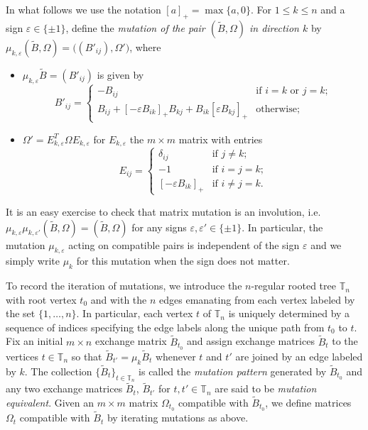 \documentclass{amsart}
\newcommand{\TT}{\mathbb{T}}
\renewcommand{\max}{\operatorname{max}}
\begin{document}
In what follows we use the notation $[a]_+=\max\{a,0\}$.
For $1\le k\le n$ and a sign $\varepsilon\in\{\pm1\}$, define the \emph{mutation of the pair $(\tilde B,\Omega)$ in direction $k$} by $\mu_{k,\varepsilon}(\tilde B,\Omega)=\big((B'_{ij}),\Omega'\big)$, where
\begin{itemize}
  \item $\mu_{k,\varepsilon}\tilde B=(B'_{ij})$ is given by
    \[B'_{ij}=\begin{cases}-B_{ij} & \text{if $i=k$ or $j=k$;}\\ B_{ij}+[-\varepsilon B_{ik}]_+B_{kj}+B_{ik}[\varepsilon B_{kj}]_+ & \text{otherwise;}\end{cases}\]
  \item $\Omega'=E_{k,\varepsilon}^T\Omega E_{k,\varepsilon}$ for $E_{k,\varepsilon}$ the $m\times m$ matrix with entries
    \[E_{ij}=\begin{cases}\delta_{ij} & \text{if $j\ne k$;}\\ -1 & \text{if $i=j=k$;}\\ [-\varepsilon B_{ik}]_+ & \text{if $i\ne j=k$.}\end{cases}\]
\end{itemize}
It is an easy exercise to check that matrix mutation is an involution, i.e.\ $\mu_{k,\varepsilon}\mu_{k,\varepsilon'}(\tilde B,\Omega)=(\tilde B,\Omega)$ for any signs $\varepsilon,\varepsilon'\in\{\pm1\}$.
In particular, the mutation $\mu_{k,\varepsilon}$ acting on compatible pairs is independent of the sign $\varepsilon$ and we simply write $\mu_k$ for this mutation when the sign does not matter.

To record the iteration of mutations, we introduce the $n$-regular rooted tree $\TT_n$ with root vertex $t_0$ and with the $n$ edges emanating from each vertex labeled by the set $\{1,\ldots,n\}$.
In particular, each vertex $t$ of $\TT_n$ is uniquely determined by a sequence of indices specifying the edge labels along the unique path from $t_0$ to $t$.
Fix an initial $m\times n$ exchange matrix $\tilde B_{t_0}$ and assign exchange matrices $\tilde B_t$ to the vertices $t\in\TT_n$ so that $\tilde B_{t'}=\mu_k\tilde B_t$ whenever $t$ and $t'$ are joined by an edge labeled by $k$.
The collection $\{\tilde B_t\}_{t\in\TT_n}$ is called the \emph{mutation pattern} generated by $\tilde B_{t_0}$ and any two exchange matrices $\tilde B_t$, $\tilde B_{t'}$ for $t,t'\in\TT_n$ are said to be \emph{mutation equivalent}.
Given an $m\times m$ matrix $\Omega_{t_0}$ compatible with $\tilde B_{t_0}$, we define matrices $\Omega_t$ compatible with $\tilde B_t$ by iterating mutations as above.
\end{document}

